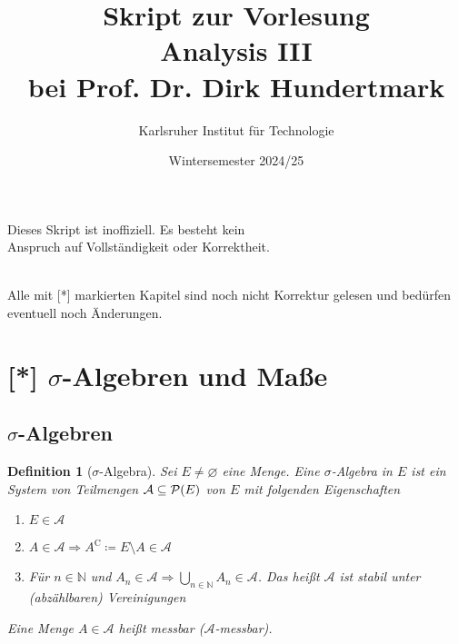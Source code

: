 \documentclass[11pt, twoside, a4paper]{article}
\theoremstyle{plain}
\newtheorem{definition}[blockelement]{Definition}
\numberwithin{equation}{subsection}
\newcommand{\of}[1]{\mathopen{}\mathclose{}\bgroup\left(#1\aftergroup\egroup\right)}
\newcommand{\impl}[0]{\Rightarrow{}}
\renewcommand{\emptyset}{\varnothing}
\newcommand{\N}{\mathbb{N}}
\begin{document}
    \title{\vspace{3cm} Skript zur Vorlesung\\Analysis III\\bei Prof. Dr. Dirk Hundertmark}
    \author{Karlsruher Institut für Technologie}
    \date{Wintersemester 2024/25}
    \maketitle
    \begin{center}
        Dieses Skript ist inoffiziell. Es besteht kein\\Anspruch auf Vollständigkeit oder Korrektheit.
    \end{center}
    \thispagestyle{empty}
    \newpage

    \tableofcontents
    ~\\
    Alle mit [*] markierten Kapitel sind noch nicht Korrektur gelesen und bedürfen eventuell noch Änderungen.

    \newpage


    


    \section{[*] $\sigma$-Algebren und Maße}

    \subsection{$\sigma$-Algebren}
    \thispagestyle{pagenumberonly}

    \begin{definition}[$\sigma$-Algebra]
        Sei $E\neq \emptyset$ eine Menge. Eine $\sigma$-Algebra in $E$ ist ein System von Teilmengen $\mathcal{A} \subseteq \mathcal{P}\of{E}$ von $E$ mit folgenden Eigenschaften
        \begin{enumerate}[label=($\Sigma_{\arabic*}$)]
            \item $E\in\mathcal{A}$
            \item $A\in\mathcal{A} \impl A^{\mathrm{C}} \coloneqq E \setminus A \in\mathcal{A}$
            \item Für $n\in\N$ und $A_n\in\mathcal{A} \impl \bigcup_{n\in\N} A_n \in\mathcal{A}$. Das heißt $\mathcal{A}$ ist stabil unter (abzählbaren) Vereinigungen
        \end{enumerate}
        Eine Menge $A\in\mathcal{A}$ heißt messbar ($\mathcal{A}$-messbar).
    \end{definition}
\end{document}
